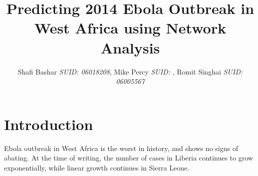 \documentclass[12pt, journal,onecolumn]{IEEEtran}
\begin{document}
\title{Predicting 2014 Ebola Outbreak in West Africa using Network Analysis}
\author{Shafi Bashar {\em SUID: 06018208}, Mike Percy {\em  SUID: }, Romit  Singhai {\em  SUID: 06005567}
}
\maketitle

%



\section{Introduction}
\label{sec:introduction}

\bigskip
{} Ebola outbreak in West Africa is the worst in history, and shows no signs
of abating. At the time of writing, the number of cases in Liberia continues to grow exponentially,
while linear growth continues in Sierra Leone.
\end{document}
